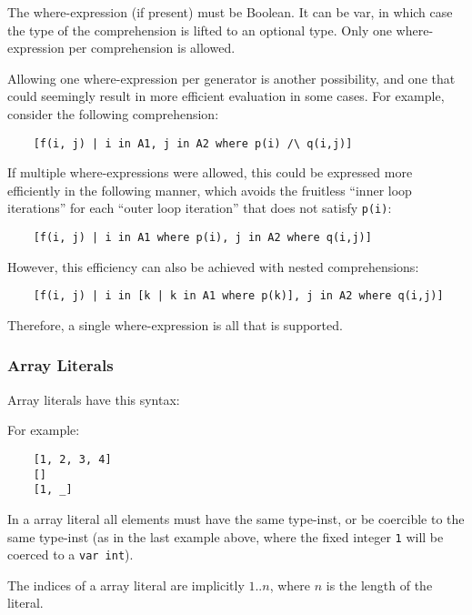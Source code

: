 \documentclass[10pt]{scrartcl}
\begin{document}
The where-expression (if present) must be Boolean.  
It can be var, in which case the type of the comprehension is lifted to an optional type.  Only one
where-expression per comprehension is allowed.

\begin{RationaleEnv}
Allowing one where-expression per generator is another possibility, and one
that could seemingly result in more efficient evaluation in some cases.  For
example, consider the following comprehension:
\begin{verbatim}
    [f(i, j) | i in A1, j in A2 where p(i) /\ q(i,j)]
\end{verbatim}
If multiple where-expressions were allowed, this could be expressed more
efficiently in the following manner, which avoids the fruitless ``inner loop
iterations'' for each ``outer loop iteration'' that does not satisfy
\texttt{p(i)}:
\begin{verbatim}
    [f(i, j) | i in A1 where p(i), j in A2 where q(i,j)]
\end{verbatim}
However, this efficiency can also be achieved with nested comprehensions:
\begin{verbatim}
    [f(i, j) | i in [k | k in A1 where p(k)], j in A2 where q(i,j)]
\end{verbatim}
Therefore, a single where-expression is all that is supported.
\end{RationaleEnv}

\subsubsection{Array Literals}
        \label{Array Literals}
Array literals have this syntax:
\begin{productions}
    \RuleSimpleArrayLiteral
\end{productions}
For example:
\begin{verbatim}
    [1, 2, 3, 4]
    []
    [1, _]
\end{verbatim}

In a array literal all elements must have the same type-inst, or
be coercible to the same type-inst (as in the last example above, where the
fixed integer \texttt{1} will be coerced to a \texttt{var int}).

The indices of a array literal are implicitly $1..n$, where $n$ is
the length of the literal.
\end{document}
